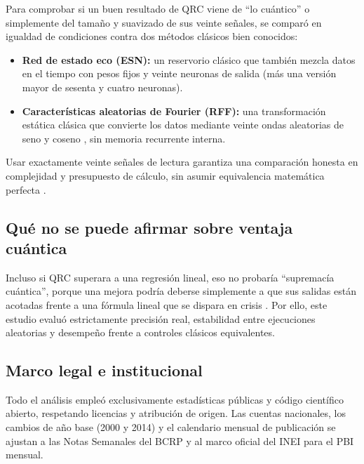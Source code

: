 Para comprobar si un buen resultado de QRC viene de ``lo cuántico'' o simplemente del tamaño y suavizado de sus veinte señales, se comparó en igualdad de condiciones contra dos métodos clásicos bien conocidos:
\begin{itemize}
	\item \textbf{Red de estado eco (ESN):} un reservorio clásico que también mezcla datos en el tiempo con pesos fijos y veinte neuronas de salida \parencite{jaeger2001} (más una versión mayor de sesenta y cuatro neuronas).
	\item \textbf{Características aleatorias de Fourier (RFF):} una transformación estática clásica que convierte los datos mediante veinte ondas aleatorias de seno y coseno \parencite{rahimi2007}, sin memoria recurrente interna.
\end{itemize}
Usar exactamente veinte señales de lectura garantiza una comparación honesta en complejidad y presupuesto de cálculo, sin asumir equivalencia matemática perfecta \parencite{schuld2021}.

\subsection{Qué no se puede afirmar sobre ventaja cuántica}

Incluso si QRC superara a una regresión lineal, eso no probaría ``supremacía cuántica'', porque una mejora podría deberse simplemente a que sus salidas están acotadas frente a una fórmula lineal que se dispara en crisis \parencite{schuld2021}. Por ello, este estudio evaluó estrictamente precisión real, estabilidad entre ejecuciones aleatorias y desempeño frente a controles clásicos equivalentes.

\subsection{Marco legal e institucional}

Todo el análisis empleó exclusivamente estadísticas públicas y código científico abierto, respetando licencias y atribución de origen. Las cuentas nacionales, los cambios de año base (2000 y 2014) y el calendario mensual de publicación se ajustan a las Notas Semanales del BCRP y al marco oficial del INEI para el PBI mensual.
